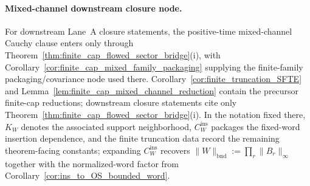 \paragraph{Mixed-channel downstream closure node.}
For downstream Lane~A closure statements, the positive-time mixed-channel Cauchy clause enters only through Theorem~\ref{thm:finite_cap_flowed_sector_bridge}(i), with Corollary~\ref{cor:finite_cap_mixed_family_packaging} supplying the finite-family packaging/covariance node used there.
Corollary~\ref{cor:finite_truncation_SFTE} and Lemma~\ref{lem:finite_cap_mixed_channel_reduction} contain the precursor finite-cap reductions; downstream closure statements cite only Theorem~\ref{thm:finite_cap_flowed_sector_bridge}(i).
In the notation fixed there, $K_W$ denotes the associated support neighborhood, $C_W^{\mathrm{ins}}$ packages the fixed-word insertion dependence, and the finite truncation data record the remaining theorem-facing constants; expanding $C_W^{\mathrm{ins}}$ recovers $\|W\|_{\mathrm{bnd}}:=\prod_r \|B_r\|_\infty$ together with the normalized-word factor from Corollary~\ref{cor:ins_to_OS_bounded_word}.

